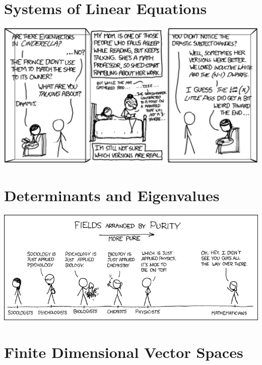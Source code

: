 \documentclass[oneside]{book}
\begin{document}
\chapter{Systems of Linear Equations} \label{chapter:syslineq}

    

\begin{savequote}
    \includegraphics[scale=0.4]{Graphics/eigenvectorxkcd.png}
\end{savequote}
\chapter{Determinants and Eigenvalues} \label{chapter:deteigen}

    

\begin{savequote}
    \includegraphics[scale=0.4]{Graphics/puremathxkcd.png}
\end{savequote}
\chapter{Finite Dimensional Vector Spaces} \label{chapter:vcspcs}

    
\end{document}

